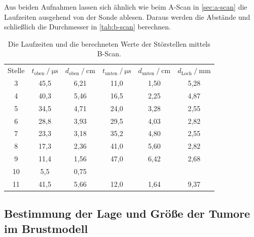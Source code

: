 Aus beiden Aufnahmen lassen sich ähnlich wie beim A-Scan in \autoref{sec:a-scan} die Laufzeiten ausgehend von der Sonde ablesen.
Daraus werden die Abstände und schließlich die Durchmesser in \autoref{tab:b-scan} berechnen.
\begin{table}[H]
  \centering
  \caption{Die Laufzeiten und die berechneten Werte der Störstellen mittels B-Scan.}
  \label{tab:b-scan}
  \begin{tabular}{c c c c c c}
    \toprule
    \multicolumn{1}{c}{Stelle} &
    \multicolumn{1}{c}{$t_\text{oben} \mathbin{/} \unit{\micro\second}$} &
    \multicolumn{1}{c}{$d_\text{oben} \mathbin{/} \unit{\centi\meter}$} &
    \multicolumn{1}{c}{$t_\text{unten} \mathbin{/} \unit{\micro\second}$} &
    \multicolumn{1}{c}{$d_\text{unten} \mathbin{/} \unit{\centi\meter}$} &
    \multicolumn{1}{c}{$d_\text{Loch} \mathbin{/} \unit{\milli\meter}$ } \\

    \cmidrule(lr){1-1} \cmidrule(lr){2-3} \cmidrule(lr){4-5} \cmidrule(lr){6-6} 
    
      3 &    45,5 &    6,21 &     11,0 &     1,50 &    5,28 \\
      4 &    40,3 &    5,46 &     16,5 &     2,25 &    4,87 \\
      5 &    34,5 &    4,71 &     24,0 &     3,28 &    2,55 \\
      6 &    28,8 &    3,93 &     29,5 &     4,03 &    2,82 \\
      7 &    23,3 &    3,18 &     35,2 &     4,80 &    2,55 \\
      8 &    17,3 &    2,36 &     41,0 &     5,60 &    2,82 \\
      9 &    11,4 &    1,56 &     47,0 &     6,42 &    2,68 \\
     10 &     5,5 &    0,75 &          &          &         \\
     11 &    41,5 &    5,66 &     12,0 &     1,64 &    9,37 \\
    \bottomrule
  \end{tabular}
\end{table}


\subsection{Bestimmung der Lage und Größe der Tumore im Brustmodell}


